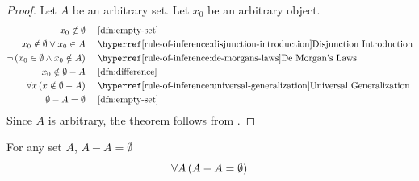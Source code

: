 \begin{proof}
    Let \( A \) be an arbitrary set. Let \( x_{0} \) be an arbitrary object.
    \begin{equation*}
        \begin{aligned}
            x_{0} \notin \emptyset& \\
            x_{0} \notin \emptyset \lor x_{0} \in A& \\
            \lnot \, \mleft( x_{0} \in \emptyset \land x_{0} \notin A \mright)& \\
            x_{0} \notin \emptyset - A& \\
            \forall x \, \mleft( x \notin \emptyset - A \mright)&\\
            \emptyset - A = \emptyset&
        \end{aligned}
        \text{  }
        \begin{aligned}
            &\quad \text{\cref{dfn:empty-set}}\\
            &\quad \text{\aref{rule-of-inference:disjunction-introduction}{Disjunction Introduction}}\\
            &\quad \text{\aref{rule-of-inference:de-morgans-laws}{De Morgan's Laws}}\\
            &\quad \text{\cref{dfn:difference}}\\
            &\quad \text{\aref{rule-of-inference:universal-generalization}{Universal Generalization}}\\
            &\quad \text{\cref{dfn:empty-set}}
        \end{aligned}
    \end{equation*}
    Since \( A \) is arbitrary, the theorem follows from .
\end{proof}

\begin{thm}[Nilpotence]
    \label{set-identities:nilpotence-of-relative-complements}
    For any set \( A \), \( A - A = \emptyset \)
    \begin{equation*}
        \forall A \, \mleft( A - A = \emptyset \mright)
    \end{equation*}
\end{thm}

